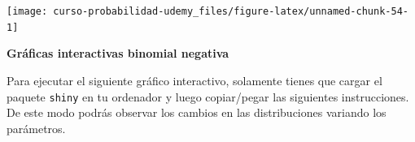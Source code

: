 \documentclass[]{book}
\newenvironment{Shaded}{\begin{snugshade}}{\end{snugshade}}
\newcommand{\DataTypeTok}[1]{\textcolor[rgb]{0.13,0.29,0.53}{#1}}
\newcommand{\DecValTok}[1]{\textcolor[rgb]{0.00,0.00,0.81}{#1}}
\newcommand{\FloatTok}[1]{\textcolor[rgb]{0.00,0.00,0.81}{#1}}
\newcommand{\KeywordTok}[1]{\textcolor[rgb]{0.13,0.29,0.53}{\textbf{#1}}}
\newcommand{\NormalTok}[1]{#1}
\newcommand{\OperatorTok}[1]{\textcolor[rgb]{0.81,0.36,0.00}{\textbf{#1}}}
\newcommand{\StringTok}[1]{\textcolor[rgb]{0.31,0.60,0.02}{#1}}
\begin{document}
\begin{center}\texttt{[image: curso-probabilidad-udemy\_files/figure-latex/unnamed-chunk-54-1]} \end{center}

\textbf{Gráficas interactivas binomial negativa}

Para ejecutar el siguiente gráfico interactivo, solamente tienes que cargar el paquete \texttt{shiny} en tu ordenador y luego copiar/pegar las siguientes instrucciones. De este modo podrás observar los cambios en las distribuciones variando los parámetros.

\begin{Shaded}
\end{Shaded}
\end{document}
